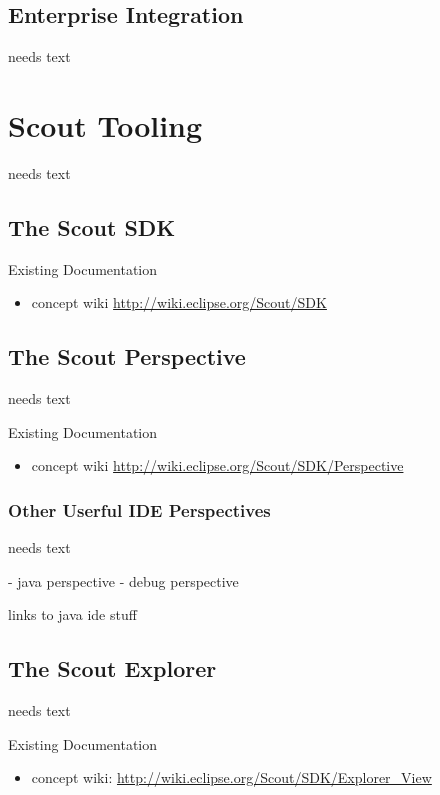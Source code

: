 \documentclass[a4paper,10pt,twoside]{book}
\begin{document}
\section{Enterprise Integration}
needs text

\chapter{Scout Tooling}

needs text

\section{The Scout SDK}

\noindent Existing Documentation
\begin{itemize}
  \item concept wiki \url{http://wiki.eclipse.org/Scout/SDK}
\end{itemize}

\section{The Scout Perspective}
needs text

\noindent Existing Documentation
\begin{itemize}
  \item concept wiki \url{http://wiki.eclipse.org/Scout/SDK/Perspective}
\end{itemize}

\subsection{Other Userful IDE Perspectives}
needs text

- java perspective
- debug perspective

links to java ide stuff

\section{The Scout Explorer}
needs text

\noindent Existing Documentation
\begin{itemize}
  \item concept wiki: \url{http://wiki.eclipse.org/Scout/SDK/Explorer_View}
\end{itemize}
\end{document}
